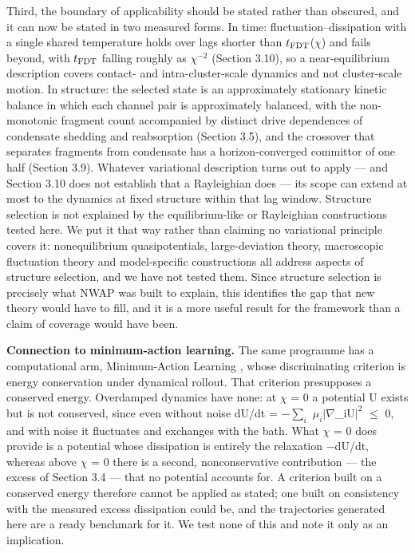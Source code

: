\documentclass[aps,pre,preprint,superscriptaddress,nofootinbib,longbibliography]{revtex4-2}
\begin{document}
Third, the boundary of applicability should be stated rather than obscured, and it can now be stated in two measured forms. In time: fluctuation--dissipation with a single shared temperature holds over lags shorter than $t_{\rm FDT}$($\chi$) and fails beyond, with $t_{\rm FDT}$ falling roughly as $\chi ^{-2}$ (Section 3.10), so a near-equilibrium description covers contact- and intra-cluster-scale dynamics and not cluster-scale motion. In structure: the selected state is an approximately stationary kinetic balance in which each channel pair is approximately balanced, with the non-monotonic fragment count accompanied by distinct drive dependences of condensate shedding and reabsorption (Section 3.5), and the crossover that separates fragments from condensate has a horizon-converged committor of one half (Section 3.9). Whatever variational description turns out to apply --- and Section 3.10 does not establish that a Rayleighian does --- its scope can extend at most to the dynamics at fixed structure within that lag window. Structure selection is not explained by the equilibrium-like or Rayleighian constructions tested here. We put it that way rather than claiming no variational principle covers it: nonequilibrium quasipotentials, large-deviation theory, macroscopic fluctuation theory and model-specific constructions all address aspects of structure selection, and we have not tested them. Since structure selection is precisely what NWAP was built to explain, this identifies the gap that new theory would have to fill, and it is a more useful result for the framework than a claim of coverage would have been.

\textbf{Connection to minimum-action learning.} The same programme has a computational arm, Minimum-Action Learning \cite{r31}, whose discriminating criterion is energy conservation under dynamical rollout. That criterion presupposes a conserved energy. Overdamped dynamics have none: at $\chi$ = 0 a potential U exists but is not conserved, since even without noise dU/dt = $-$$\sum_{i}$ $\mu_{i}$$| \nabla$\_iU$| ^{2}$ $\le$ 0, and with noise it fluctuates and exchanges with the bath. What $\chi$ = 0 does provide is a potential whose dissipation is entirely the relaxation $-$dU/dt, whereas above $\chi$ = 0 there is a second, nonconservative contribution --- the excess of Section 3.4 --- that no potential accounts for. A criterion built on a conserved energy therefore cannot be applied as stated; one built on consistency with the measured excess dissipation could be, and the trajectories generated here are a ready benchmark for it. We test none of this and note it only as an implication.
\end{document}

